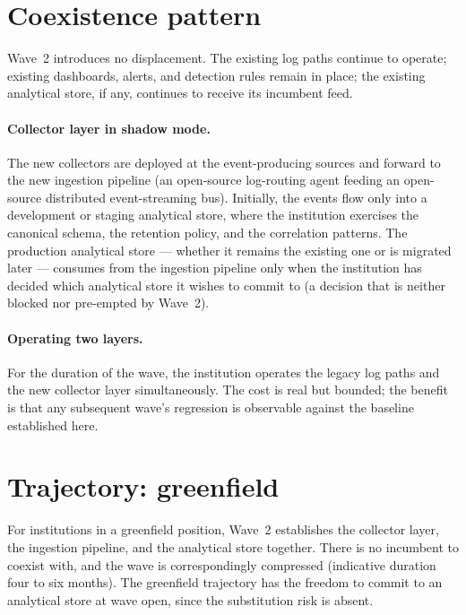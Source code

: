 \section{Coexistence pattern}
\label{sec:w2-coexistence}

Wave~2 introduces no displacement. The existing log paths continue
to operate; existing dashboards, alerts, and detection rules
remain in place; the existing analytical store, if any, continues
to receive its incumbent feed.

\paragraph{Collector layer in shadow mode.} The new collectors are
deployed at the event-producing sources and forward to the new
ingestion pipeline (an open-source log-routing agent feeding an
open-source distributed event-streaming bus). Initially, the
events flow only into a development or
staging analytical store, where the institution exercises the
canonical schema, the retention policy, and the correlation
patterns. The production analytical store --- whether it remains
the existing one or is migrated later --- consumes from the
ingestion pipeline only when the institution has decided which
analytical store it wishes to commit to (a decision that is
neither blocked nor pre-empted by Wave~2).

\paragraph{Operating two layers.} For the duration of the wave, the
institution operates the legacy log paths and the new collector
layer simultaneously. The cost is real but bounded; the benefit is
that any subsequent wave's regression is observable against the
baseline established here.

\section{Trajectory: greenfield}
\label{sec:w2-greenfield}

For institutions in a greenfield position, Wave~2 establishes the
collector layer, the ingestion pipeline, and the analytical store
together. There is no incumbent to coexist with, and the wave is
correspondingly compressed (indicative duration four to six
months). The greenfield trajectory has the freedom to commit to an
analytical store at wave open, since the substitution risk is
absent.

